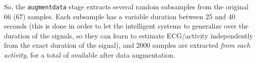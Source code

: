 So, the \texttt{augmentdata} stage extracts several random subsamples from the
original 66 (67) samples. Each subsample has a variable duration between
25 and 40 seconds (this is done in order to let the intelligent systems to
generalize over the duration of the signals, so they can learn to estimate
ECG/activity independently from the exact duration of the signal), and 2000
samples are extracted \emph{from each activity}, for a total of  available after data augmentation.
